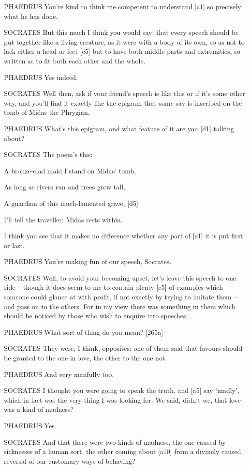 PHAEDRUS You're kind to think me competent to understand {[}c1{]} so
precisely what he has done.

SOCRATES But this much I think you would say: that every speech should
be put together like a living creature, as it were with a body of its
own, so as not to lack either a head or feet {[}c5{]} but to have both
middle parts and extremities, so written as to fit both each other and
the whole.

PHAEDRUS Yes indeed.

SOCRATES Well then, ask if your friend's speech is like this or if it's
some other way, and you'll find it exactly like the epigram that some
say is inscribed on the tomb of Midas the
Phrygian.

PHAEDRUS What's this epigram, and what feature of it are you {[}d1{]}
talking about?

SOCRATES The poem's this:

A bronze-clad maid I stand on Midas' tomb,

As long as rivers run and trees grow tall,

A guardian of this much-lamented grave, {[}d5{]}

I'll tell the traveller: Midas rests within.

I think you see that it makes no difference whether any part of {[}e1{]}
it is put first or last.

PHAEDRUS You're making fun of our speech, Socrates.

SOCRATES Well, to avoid your becoming upset, let's leave this speech to
one side -- though it does seem to me to contain plenty {[}e5{]} of
examples which someone could glance at with profit, if not exactly by
trying to imitate them -- and pass on to the others. For in my view
there was something in them which should be noticed by those who wish to
enquire into speeches.

PHAEDRUS What sort of thing do you mean? {[}265a{]}

SOCRATES They were, I think, opposites: one of them said that favours
should be granted to the one in love, the other to the one not.

PHAEDRUS And very manfully too.

SOCRATES I thought you were going to speak the truth, and {[}a5{]} say
‘madly', which in fact was the very thing I was looking for. We said,
didn't we, that love was a kind of madness?

PHAEDRUS Yes.

SOCRATES And that there were two kinds of madness, the one caused by
sicknesses of a human sort, the other coming about {[}a10{]} from a
divinely caused reversal of our customary ways of behaving?

